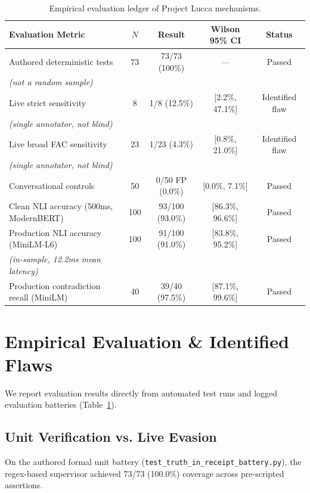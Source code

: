\documentclass[10pt,twocolumn]{article}
\begin{document}
\begin{table}[t]
\centering
\small
\begin{tabular}{lcccc}
\toprule
\textbf{Evaluation Metric} & $N$ & \textbf{Result} & \textbf{Wilson 95\% CI} & \textbf{Status} \\
\midrule
Authored deterministic tests & 73 & 73/73 (100\%) & --- & Passed \\
\quad \textit{(not a random sample)} & & & & \\
Live strict sensitivity & 8 & 1/8 (12.5\%) & [2.2\%, 47.1\%] & Identified flaw \\
\quad \textit{(single annotator, not blind)} & & & & \\
Live broad FAC sensitivity & 23 & 1/23 (4.3\%) & [0.8\%, 21.0\%] & Identified flaw \\
\quad \textit{(single annotator, not blind)} & & & & \\
Conversational controls & 50 & 0/50 FP (0.0\%) & [0.0\%, 7.1\%] & Passed \\
Clean NLI accuracy (500ms, ModernBERT) & 100 & 93/100 (93.0\%) & [86.3\%, 96.6\%] & Passed \\
Production NLI accuracy (MiniLM-L6) & 100 & 91/100 (91.0\%) & [83.8\%, 95.2\%] & Passed \\
\quad \textit{(in-sample, 12.2ms mean latency)} & & & & \\
Production contradiction recall (MiniLM) & 40 & 39/40 (97.5\%) & [87.1\%, 99.6\%] & Passed \\
\bottomrule
\end{tabular}
\caption{Empirical evaluation ledger of Project Lucca mechanisms.}
\label{tab:results}
\end{table}

\section{Empirical Evaluation \& Identified Flaws}
We report evaluation results directly from automated test runs and logged evaluation batteries (Table~\ref{tab:results}).

\subsection{Unit Verification vs. Live Evasion}
On the authored formal unit battery (\texttt{test\_truth\_in\_receipt\_battery.py}), the regex-based supervisor achieved 73/73 (100.0\%) coverage across pre-scripted assertions. 
\end{document}
